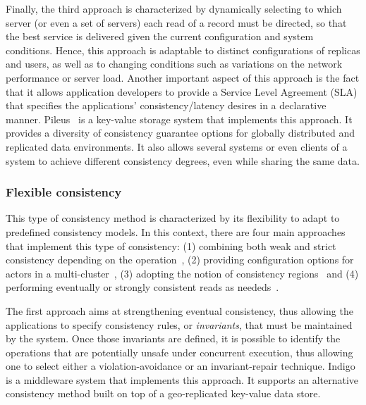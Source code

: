 Finally, the third approach is characterized by dynamically selecting to which server (or even a set of servers) each read of a record must be directed, so that the best service is delivered given the current configuration and system conditions. Hence, this approach is adaptable to distinct configurations of replicas and users, as well as to changing conditions such as variations on the network performance or server load. Another important aspect of this approach is the fact that it allows application developers to provide a Service Level Agreement (SLA) that specifies the applications' consistency/latency desires in a declarative~ manner.  Pileus~\cite{Terry:2013} is a key-value storage system that implements this approach. It provides a diversity of consistency guarantee options for globally distributed and replicated data environments. It also allows several systems or even clients of a system to achieve different consistency degrees, even while sharing the same data.

\subsubsection{Flexible consistency}

This type of consistency method is characterized by its flexibility to adapt to predefined consistency models. In this context, there are four main approaches that implement this type of consistency: (1) combining both weak and strict consistency depending on the operation~\cite{balegas2015putting}, (2) providing configuration options for actors in a multi-cluster~\cite{BernsteinBBCFKK17}, (3) adopting the notion of consistency regions~\cite{Chen:2014} and (4) performing eventually or strongly consistent reads as neededs~\cite{sivasubramanian2012amazon}.

The first approach aims at strengthening eventual consistency, thus allowing the applications to specify consistency rules, or \textit{invariants}, that must be maintained by the system. Once those invariants are defined, it is possible to identify the operations that are potentially unsafe under concurrent execution, thus allowing one to select either a violation-avoid\-ance or an invariant-repair technique. Indigo~\cite{balegas2015putting} is a middleware system that implements this approach. It supports an alternative consistency method built on top of a geo-replicated key-value data store. 

